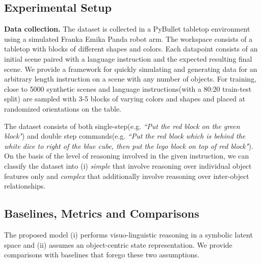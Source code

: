 \subsection{Experimental Setup}
\textbf{Data collection. } 
The dataset is collected in a PyBullet tabletop environment using a 
simulated Franka Emika Panda robot arm. The workspace consists of a tabletop with blocks of different shapes and colors.
%
Each datapoint consists of an initial scene paired with a language instruction and the expected resulting final scene. We provide a framework for quickly simulating and generating data for an arbitrary length instruction on a scene with any number of objects.
For training, close to 5000 synthetic scenes and language instructions(with a 80:20 train-test split) are sampled with 3-5 blocks of varying colors and shapes and placed at randomized orientations on the table. 
%
%

The dataset consists of both single-step(e.g. \emph{``Put the red block on the green block"}) and double step commands(e.g. \emph{``Put the red block which is behind the white dice to right of the blue cube, then put the lego block on top of red block"}). 
On the basis of the level of reasoning involved in the given instruction, we can classify the dataset into (i) \textit{simple} that involve reasoning over individual object features only and \textit{complex} that additionally involve reasoning over inter-object relationships.

\subsection{Baselines, Metrics and Comparisons} 
The proposed model (i) performs visuo-linguistic reasoning in a symbolic latent space and (ii) assumes an object-centric state representation. We provide comparisons with baselines that forego these two assumptions.


